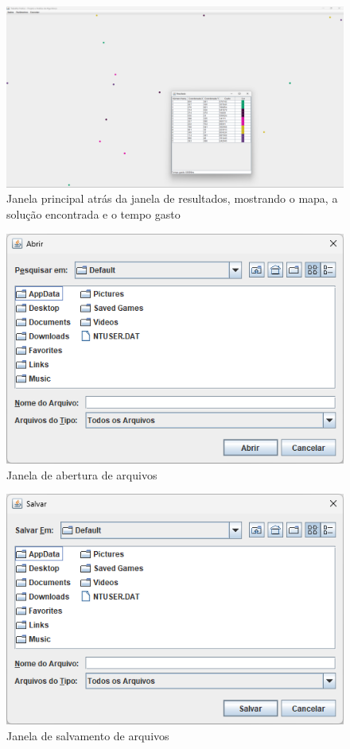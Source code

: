 \documentclass[12pt]{article}
\begin{document}
\begin{figure}[H]
    \centering
    \includegraphics[width=\textwidth]{Captura de tela 2024-06-01 110931}
    \caption{Janela principal atrás da janela de resultados, mostrando o mapa, a solução encontrada e o tempo gasto}
    \label{fig:fig-5}
\end{figure}

\begin{figure}[H]
    \centering
    \includegraphics[width=\textwidth]{Captura de tela 2024-06-01 111051}
    \caption{Janela de abertura de arquivos}
    \label{fig:fig-6}
\end{figure}

\begin{figure}[H]
    \centering
    \includegraphics[width=\textwidth]{Captura de tela 2024-06-01 111107}
    \caption{Janela de salvamento de arquivos}
    \label{fig:fig-7}
\end{figure}
\end{document}
